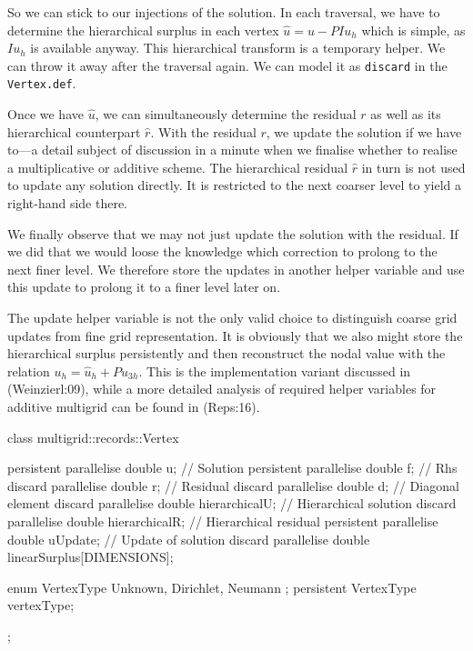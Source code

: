 So we can stick to our injections of the solution. 
In each traversal, we have to determine the hierarchical surplus in each vertex
$\hat u = u - PIu_h$ which is simple, as $Iu_h$ is available anyway.
This hierarchical transform is a temporary helper. 
We can throw it away after the traversal again.
We can model it as \texttt{discard} in the \texttt{Vertex.def}.

Once we have $\hat u$, we can simultaneously determine the residual $r$ as well
as its hierarchical counterpart $\hat r$. 
With the residual $r$, we update the solution if we have to---a detail subject
of discussion in a minute when we finalise whether to realise a multiplicative
or additive scheme.
The hierarchical residual $\hat r$ in turn is not used to update any solution
directly.
It is restricted to the next coarser level to yield a right-hand side there.


We finally observe that we may not just update the solution with the residual.
If we did that we would loose the knowledge which correction to prolong to the
next finer level.
We therefore store the updates in another helper variable and use this update to
prolong it to a finer level later on.

\begin{remark}
  The update helper variable is not the only valid choice to
  distinguish coarse grid updates from fine grid representation. It is obviously
  that we also might store the hierarchical surplus persistently and then
  reconstruct the nodal value with the relation $u_h=\hat u_h+Pu_{3h}$. This is
  the implementation variant discussed in (Weinzierl:09), while a more detailed
  analysis of required helper variables for additive multigrid can be found in
  (Reps:16).
\end{remark}



\begin{code}
class multigrid::records::Vertex {  
  persistent parallelise double  u;             // Solution
  persistent parallelise double  f;             // Rhs
  discard parallelise double     r;             // Residual
  discard parallelise double     d;             // Diagonal element
  discard parallelise double     hierarchicalU; // Hierarchical solution
  discard parallelise double     hierarchicalR; // Hierarchical residual
  persistent parallelise double  uUpdate;       // Update of solution
  discard parallelise double     linearSurplus[DIMENSIONS];

  enum VertexType {
    Unknown, Dirichlet, Neumann
  };
  persistent VertexType vertexType;
};
\end{code}


